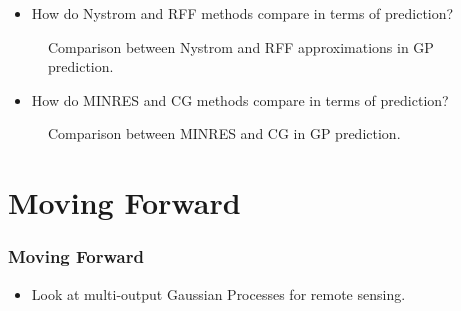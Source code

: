 \documentclass[9pt,hyperref={pdfpagelabels=false},xcolor=table]{beamer}
\begin{document}
\begin{frame}
    \begin{itemize}
        \item How do Nystrom and RFF methods compare in terms of prediction?
    \end{itemize}
    \begin{figure}
        \centering
        \caption{Comparison between Nystrom and RFF approximations in GP prediction.}
    \end{figure}
\end{frame}

\begin{frame}
    \begin{itemize}
        \item How do MINRES and CG methods compare in terms of prediction?
    \end{itemize}
    \begin{figure}
        \centering
        \caption{Comparison between MINRES and CG in GP prediction.}
    \end{figure}
\end{frame}

\section{Moving Forward}

\begin{frame}
    \frametitle{Moving Forward}
    \begin{itemize}
        \item Look at multi-output Gaussian Processes for remote sensing.
    \end{itemize}
\end{frame}
\end{document}

